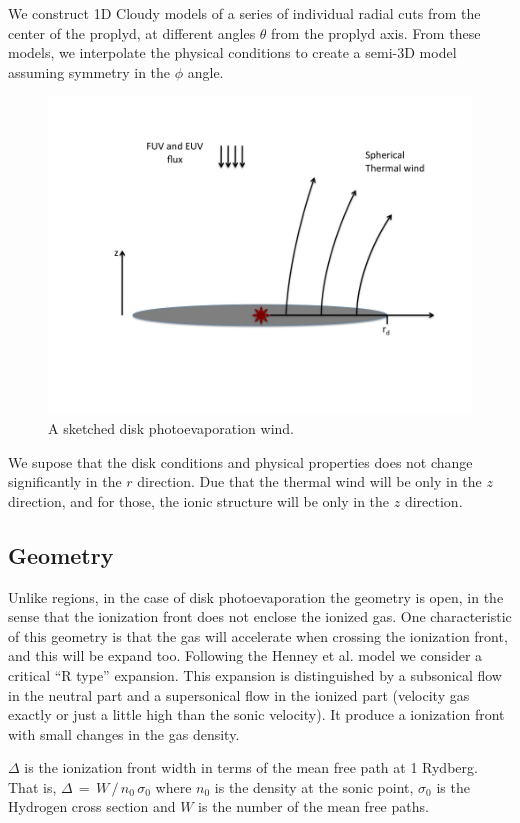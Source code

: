 \documentclass[useAMS,usenatbib]{mn2e}
\begin{document}
We construct 1D Cloudy models of a series of individual radial cuts from the center of the proplyd, at different angles $\theta$ from the proplyd axis. From these models, we interpolate the physical conditions to create a semi-3D model assuming symmetry in the $\phi$ angle.

\begin{figure}
\centering
  \includegraphics[width=8.5 cm]{viento.jpg}
  \caption{A sketched disk photoevaporation wind.} \label{fig:wind}
\end{figure}

We supose that the disk conditions and physical properties does not change significantly in the $r$ direction. Due that the thermal wind will be only in the $z$ direction, and for those, the ionic structure will be only in the $z$ direction.

\subsection{Geometry}
\label{sec:geometry}

Unlike \hii regions, in the case of disk photoevaporation the geometry is open, in the sense that the ionization front does not enclose the ionized gas. One characteristic of this geometry is that the gas will accelerate when crossing the ionization front, and this will be expand too.
Following the Henney et al. model we consider a critical ``R type'' expansion. This expansion is distinguished by a subsonical flow in the neutral part and a supersonical flow in the ionized part (velocity gas exactly or just a little high than the sonic velocity). It produce a ionization front with small changes in the gas density.

$\Delta$ is the ionization front width in terms of the mean free path at 1 Rydberg. That is, $\Delta \, = \, W \, / \, n_0 \, \sigma_0$ where $n_0$ is the density at the sonic point, $\sigma_0$ is the Hydrogen cross section and $W$ is the number of the mean free paths.
\end{document}
